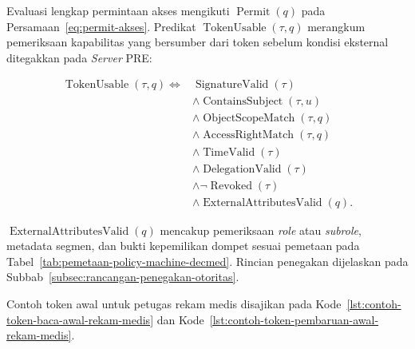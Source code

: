 Evaluasi lengkap permintaan akses mengikuti $\operatorname{Permit}(q)$ pada Persamaan~\ref{eq:permit-akses}. Predikat $\operatorname{TokenUsable}(\tau,q)$ merangkum pemeriksaan kapabilitas yang bersumber dari token sebelum kondisi eksternal ditegakkan pada \textit{Server} PRE:

\begin{equation}
	\begin{split}
		\operatorname{TokenUsable}(\tau,q)
		\iff {} &
		\operatorname{SignatureValid}(\tau)                        \\
		        & \land \operatorname{ContainsSubject}(\tau,u)     \\
		        & \land \operatorname{ObjectScopeMatch}(\tau,q)    \\
		        & \land \operatorname{AccessRightMatch}(\tau,q)    \\
		        & \land \operatorname{TimeValid}(\tau)             \\
		        & \land \operatorname{DelegationValid}(\tau)       \\
		        & \land \neg\operatorname{Revoked}(\tau)           \\
		        & \land \operatorname{ExternalAttributesValid}(q).
	\end{split}
	\label{eq:token-usable}
\end{equation}

$\operatorname{ExternalAttributesValid}(q)$ mencakup pemeriksaan \textit{role} atau \textit{subrole}, metadata segmen, dan bukti kepemilikan dompet sesuai pemetaan pada Tabel~\ref{tab:pemetaan-policy-machine-decmed}. Rincian penegakan dijelaskan pada Subbab~\ref{subsec:rancangan-penegakan-otoritas}.

Contoh token awal untuk petugas rekam medis disajikan pada Kode~\ref{lst:contoh-token-baca-awal-rekam-medis} dan Kode~\ref{lst:contoh-token-pembaruan-awal-rekam-medis}.
